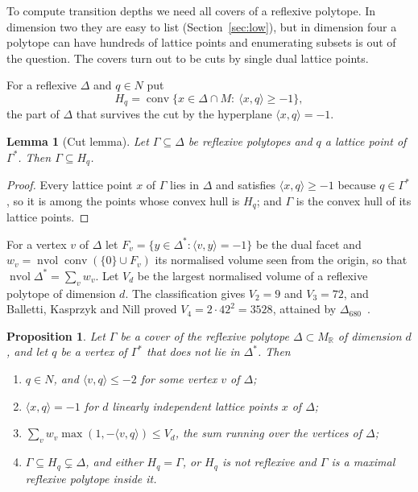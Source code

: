 \documentclass[manuscript]{aomart}
\newtheorem{lemma}[theorem]{Lemma}
\newtheorem{proposition}[theorem]{Proposition}
\theoremstyle{definition}
\theoremstyle{remark}
\newcommand{\R}{\mathbb{R}}
\newcommand{\ip}[2]{\langle #1,#2\rangle}
\newcommand{\conv}{\operatorname{conv}}
\newcommand{\nvol}{\operatorname{nvol}}
\newcommand{\Dbig}{\Delta_{680}}
\begin{document}
To compute transition depths we need all covers of a reflexive polytope.
In dimension two they are easy to list (Section~\ref{sec:low}), but in
dimension four a polytope can have hundreds of lattice points and
enumerating subsets is out of the question. The covers turn out to be cuts
by single dual lattice points.

For a reflexive $\Delta$ and $q\in N$ put
\[
H_q=\conv\{x\in\Delta\cap M:\ \ip{x}{q}\ge-1\},
\]
the part of $\Delta$ that survives the cut by the hyperplane
$\ip{x}{q}=-1$.

\begin{lemma}[Cut lemma]\label{lem:cut}
Let $\Gamma\subseteq\Delta$ be reflexive polytopes and $q$ a lattice point
of $\Gamma^*$. Then $\Gamma\subseteq H_q$.
\end{lemma}

\begin{proof}
Every lattice point $x$ of $\Gamma$ lies in $\Delta$ and satisfies
$\ip{x}{q}\ge-1$ because $q\in\Gamma^*$, so it is among the points whose
convex hull is $H_q$; and $\Gamma$ is the convex hull of its lattice
points.
\end{proof}

For a vertex $v$ of $\Delta$ let $F_v=\{y\in\Delta^*:\ip{v}{y}=-1\}$ be the
dual facet and $w_v=\nvol\conv(\{0\}\cup F_v)$ its normalised volume seen
from the origin, so that $\nvol\Delta^*=\sum_v w_v$. Let $V_d$ be the
largest normalised volume of a reflexive polytope of dimension $d$. The
classification gives $V_2=9$ and $V_3=72$, and Balletti, Kasprzyk and Nill
proved $V_4=2\cdot42^2=3528$, attained by $\Dbig$~\cite{BKN22}.

\begin{proposition}\label{prop:cuts}
Let $\Gamma$ be a cover of the reflexive polytope $\Delta\subset M_\R$ of
dimension $d$, and let $q$ be a vertex of $\Gamma^*$ that does not lie in
$\Delta^*$. Then
\begin{enumerate}[label=\textup{(\alph*)},leftmargin=*]
\item $q\in N$, and $\ip{v}{q}\le-2$ for some vertex $v$ of $\Delta$;
\item $\ip{x}{q}=-1$ for $d$ linearly independent lattice points $x$ of
$\Delta$;
\item $\sum_v w_v\max(1,-\ip{v}{q})\le V_d$, the sum running over the
vertices of $\Delta$;
\item $\Gamma\subseteq H_q\subsetneq\Delta$, and either $H_q=\Gamma$, or
$H_q$ is not reflexive and $\Gamma$ is a maximal reflexive polytope inside
it.
\end{enumerate}
\end{proposition}
\end{document}
